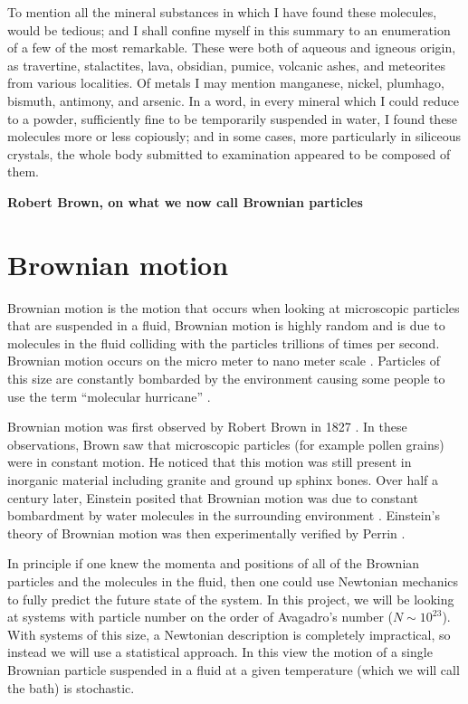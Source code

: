 \epigraph{
To mention all the mineral substances in which I have found these molecules, would be tedious; and I shall confine myself in this summary to an enumeration of a few of the most remarkable. These were both of aqueous and igneous origin, as travertine, stalactites, lava, obsidian, pumice, volcanic ashes, and meteorites from various localities. Of metals I may mention manganese, nickel, plumhago, bismuth, antimony, and arsenic. In a word, in every mineral which I could reduce to a powder, sufficiently fine to be temporarily suspended in water, I found these molecules more or less copiously; and in some cases, more particularly in siliceous crystals, the whole body submitted to examination appeared to be composed of them.}{\textbf{Robert Brown, on what we now call Brownian particles}}

\section{Brownian motion}
Brownian motion is the motion that occurs when looking at microscopic particles that are suspended in a fluid, Brownian motion is highly random and is due to molecules in the fluid colliding with the particles trillions of times per second. Brownian motion occurs on the micro meter to nano meter scale \cite{KellerBustamante2000,Reimann2001}. Particles of this size are constantly bombarded by the environment causing some people to use the term ``molecular hurricane'' \cite{Astumian2007}.

Brownian motion was first observed by Robert Brown in 1827 \cite{Brown1828}. In these observations, Brown saw that microscopic particles (for example pollen grains) were in constant motion. He noticed that this motion was still present in inorganic material including granite and ground up sphinx bones.
Over half a century later, Einstein posited that Brownian motion was due to constant bombardment by water molecules in the surrounding environment \cite{Einstein1905}. Einstein's theory of Brownian motion was then experimentally verified by Perrin \cite{Perrin2013}.

In principle if one knew the momenta and positions of all of the Brownian particles and the molecules in the fluid, then one could use Newtonian mechanics to fully predict the future state of the system. In this project, we will be looking at systems with particle number on the order of Avagadro's number ($N \sim 10^{23}$). With systems of this size, a Newtonian description is completely impractical, so instead we will use a statistical approach. In this view the motion of a single Brownian particle suspended in a fluid at a given temperature (which we will call the bath) is stochastic.


